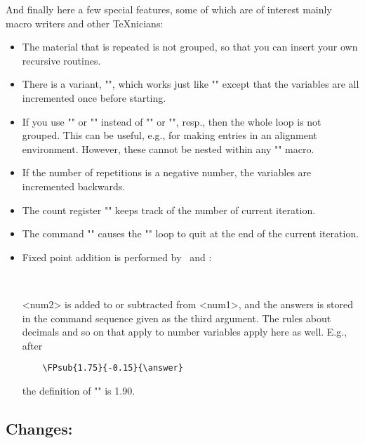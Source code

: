  And finally here a few special features, some of which are of interest mainly
macro writers and other \TeX nicians:
\begin{itemize}
 \item The material that is repeated is not grouped, so that you can insert
your own recursive routines.
 \item There is a variant, "\mmultido", which works just like "\multido"
except that the variables are all incremented once before starting.
 \item If you use "\Multido" or "\MMultido" instead of "\multido" or
"\mmultido", resp., then the whole loop is not grouped. This can be useful,
e.g., for making entries in an alignment environment. However, these cannot be
nested within any "\multido" macro.
 \item If the number of repetitions is a negative number, the variables are
incremented backwards.
 \item The count register "\multidocount" keeps track of the number of current
iteration.
 \item The command "\multidostop" causes the "\multido" loop to quit at the
end of the current iteration.
\item Fixed point addition is performed by \N\FPadd\ and \N\FPsub:
\begin{MD}
  \\
\end{MD}
 <num2> is added to or subtracted from <num1>, and the answers is stored in
the command sequence given as the third argument. The rules about decimals and
so on that apply to number variables apply here as well. E.g., after
\begin{verbatim}
    \FPsub{1.75}{-0.15}{\answer}
\end{verbatim}
the definition of "\answer" is 1.90.
\end{itemize}

\subsection*{Changes:}



